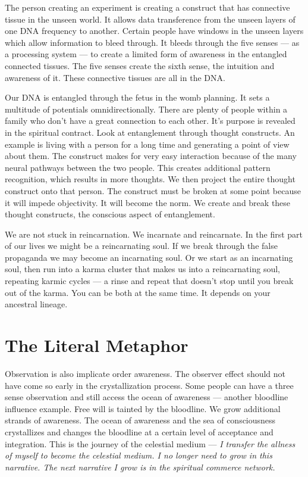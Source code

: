 \documentclass[letterpaper,9pt,twoside,titlepage,onecolumn,openany]{book}
\begin{document}
The person creating an experiment is creating a construct that has
connective tissue in the unseen world. It allows data transference from
the unseen layers of one DNA frequency to another. Certain people have
windows in the unseen layers which allow information to bleed through.
It bleeds through the five senses --- as a processing system --- to
create a limited form of awareness in the entangled connected tissues.
The five senses create the sixth sense, the intuition and awareness of
it. These connective tissues are all in the DNA.

Our DNA is entangled through the fetus in the womb planning. It sets a
multitude of potentials omnidirectionally. There are plenty of people
within a family who don't have a great connection to each other. It's
purpose is revealed in the spiritual contract. Look at entanglement
through thought constructs. An example is living with a person for a
long time and generating a point of view about them. The construct makes
for very easy interaction because of the many neural pathways between
the two people. This creates additional pattern recognition, which
results in more thoughts. We then project the entire thought construct
onto that person. The construct must be broken at some point because it
will impede objectivity. It will become the norm. We create and break
these thought constructs, the conscious aspect of entanglement.

We are not stuck in reincarnation. We incarnate and reincarnate. In the
first part of our lives we might be a reincarnating soul. If we break
through the false propaganda we may become an incarnating soul. Or we
start as an incarnating soul, then run into a karma cluster that makes
us into a reincarnating soul, repeating karmic cycles --- a rinse and
repeat that doesn't stop until you break out of the karma. You can be
both at the same time. It depends on your ancestral lineage.

\section*{The Literal Metaphor}\label{the-literal-metaphor}

Observation is also implicate order awareness. The observer effect
should not have come so early in the crystallization process. Some
people can have a three sense observation and still access the ocean of
awareness --- another bloodline influence example. Free will is tainted
by the bloodline. We grow additional strands of awareness. The ocean of
awareness and the sea of consciousness crystallizes and changes the
bloodline at a certain level of acceptance and integration. This is the
journey of the celestial medium --- \emph{I transfer the allness of
myself to become the celestial medium. I no longer need to grow in this
narrative. The next narrative I grow is in the spiritual commerce
network.}
\end{document}
